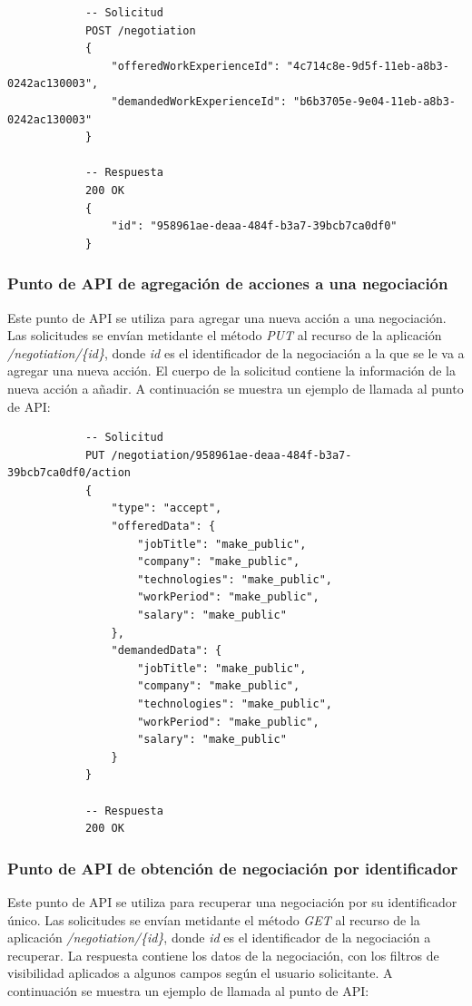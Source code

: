 \documentclass[a4paper, 12pt]{book}
\begin{document}
        {\footnotesize
    \begin{verbatim}
			-- Solicitud
			POST /negotiation
			{
			    "offeredWorkExperienceId": "4c714c8e-9d5f-11eb-a8b3-0242ac130003",
			    "demandedWorkExperienceId": "b6b3705e-9e04-11eb-a8b3-0242ac130003"
			}

			-- Respuesta
			200 OK
			{
			    "id": "958961ae-deaa-484f-b3a7-39bcb7ca0df0"
			}
    \end{verbatim}
    }

    \subsubsection{Punto de API de agregación de acciones a una negociación}
    \label{subsec:put_negotiation}
    Este punto de API se utiliza para agregar una nueva acción a una negociación.
    Las solicitudes se envían metidante el método \emph{PUT} al recurso de la aplicación \emph{/negotiation/\{id\}}, donde \emph{id} es el identificador de la negociación a la que se le va a agregar una nueva acción.
    El cuerpo de la solicitud contiene la información de la nueva acción a añadir.
    A continuación se muestra un ejemplo de llamada al punto de API:

        {\footnotesize
    \begin{verbatim}
			-- Solicitud
			PUT /negotiation/958961ae-deaa-484f-b3a7-39bcb7ca0df0/action
			{
			    "type": "accept",
			    "offeredData": {
			        "jobTitle": "make_public",
			        "company": "make_public",
			        "technologies": "make_public",
			        "workPeriod": "make_public",
			        "salary": "make_public"
			    },
			    "demandedData": {
			        "jobTitle": "make_public",
			        "company": "make_public",
			        "technologies": "make_public",
			        "workPeriod": "make_public",
			        "salary": "make_public"
			    }
			}

			-- Respuesta
			200 OK
    \end{verbatim}
    }

    \subsubsection{Punto de API de obtención de negociación por identificador}
    \label{subsec:get_negotiation_id}
    Este punto de API se utiliza para recuperar una negociación por su identificador único.
    Las solicitudes se envían metidante el método \emph{GET} al recurso de la aplicación \emph{/negotiation/\{id\}}, donde \emph{id} es el identificador de la negociación a recuperar.
    La respuesta contiene los datos de la negociación, con los filtros de visibilidad aplicados a algunos campos según el usuario solicitante.
    A continuación se muestra un ejemplo de llamada al punto de API:
\end{document}
